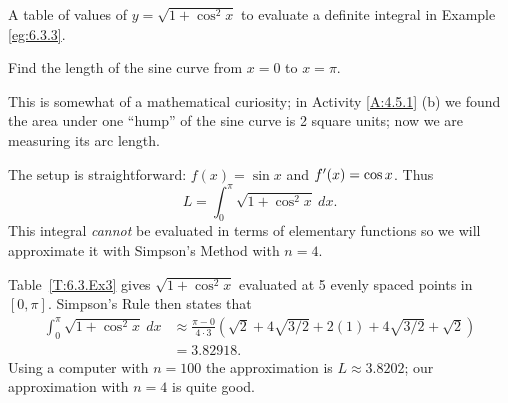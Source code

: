 \begin{margintable}[3cm]
\begin{center}
\end{center}
\caption{A table of values of $y=\sqrt{1+\cos^2x}$ to evaluate a definite integral in Example \ref{eg:6.3.3}.} \label{T:6.3.Ex3}
\end{margintable}

\begin{example} \label{eg:6.3.3} %
Find the length of the sine curve from $x=0$ to $x=\pi$.

\solution This is somewhat of a mathematical curiosity; in Activity \ref{A:4.5.1} (b) we found the area under one ``hump'' of the sine curve is 2 square units; now we are measuring its arc length.

The setup is straightforward: $f(x) = \sin x$ and $f'(x) = \cos x$. Thus 
$$L = \int_0^\pi \sqrt{1+\cos^2x}\ dx.$$
This integral \textit{cannot} be evaluated in terms of elementary functions so we will approximate it with Simpson's Method with $n=4$. 

Table~\ref{T:6.3.Ex3} gives $\sqrt{1+\cos^2x}$ evaluated at 5 evenly spaced points in $[0,\pi]$. Simpson's Rule then states that 
\begin{align*}
\int_0^\pi \sqrt{1+\cos^2x}\ dx &\approx	\frac{\pi-0}{4\cdot 3}\left(\sqrt{2}+4\sqrt{3/2}+2(1)+4\sqrt{3/2}+\sqrt{2}\right) \\
			&=3.82918.
\end{align*}
Using a computer with $n=100$ the approximation is $L\approx 3.8202$; our approximation with $n=4$ is quite good.
\end{example}